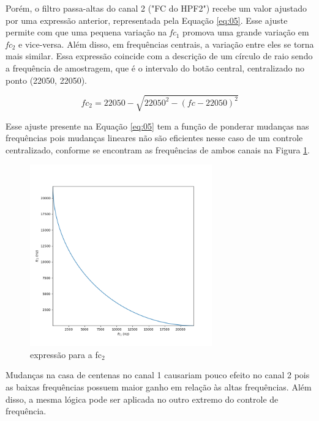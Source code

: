     Porém, o filtro passa-altas do canal 2 ("FC do HPF2") recebe um valor ajustado por uma expressão anterior, representada pela Equação \ref{eq:05}. Esse ajuste permite com que uma pequena variação na \textit{fc$_{1}$} promova uma grande variação em \textit{fc$_{2}$} e vice-versa. Além disso, em frequências centrais, a variação entre eles se torna mais similar. Essa expressão coincide com a descrição de um círculo de raio sendo a frequência de amostragem, que é o intervalo do botão central, centralizado no ponto (22050, 22050).

    \begin{equation}  \label{eq:05}
        fc_2 = 22050 - \sqrt{22050^2 - (fc - 22050)^2}
    \end{equation}

    Esse ajuste presente na Equação \ref{eq:05} tem a função de ponderar mudanças nas frequências pois mudanças lineares não são eficientes nesse caso de um controle centralizado, conforme se encontram as frequências de ambos canais na Figura \ref{fig45}.

    \begin{figure}[h]
        \centering
        \includegraphics[width=0.7\textwidth]{figuras/fig45.png}
        \caption{expressão para a fc$_{2}$}
        \label{fig45}
    \end{figure}

    \newpage
    Mudanças na casa de centenas no canal 1 causariam pouco efeito no canal 2 pois as baixas frequências possuem maior ganho em relação às altas frequências. Além disso, a mesma lógica pode ser aplicada no outro extremo do controle de frequência. 

